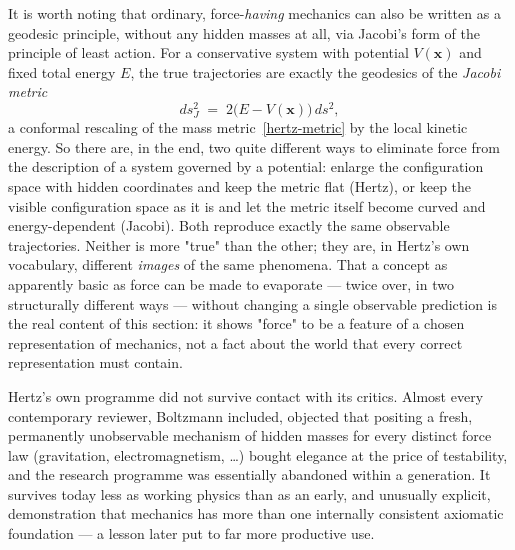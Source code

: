 It is worth noting that ordinary, force-\emph{having} mechanics can
also be written as a geodesic principle, without any hidden masses
at all, via Jacobi's form of the principle of least action. For a
conservative system with potential $V(\mathbf x)$ and fixed total
energy $E$, the true trajectories are exactly the geodesics of the
\emph{Jacobi metric}
\begin{equation}
  ds_J^2 \;=\; 2\bigl(E-V(\mathbf x)\bigr)\, ds^2 ,
  \label{jacobi-metric}
\end{equation}
a conformal rescaling of the mass metric~\eqref{hertz-metric} by
the local kinetic energy. So there are, in the end, two quite
different ways to eliminate force from the description of a system
governed by a potential: enlarge the configuration space with hidden
coordinates and keep the metric flat (Hertz), or keep the visible
configuration space as it is and let the metric itself become curved
and energy-dependent (Jacobi). Both reproduce exactly the same
observable trajectories. Neither is more "true" than the other; they
are, in Hertz's own vocabulary, different \emph{images} of the same
phenomena. That a concept as apparently basic as force can be made
to evaporate --- twice over, in two structurally different ways ---
without changing a single observable prediction is the real content
of this section: it shows "force" to be a feature of a chosen
representation of mechanics, not a fact about the world that every
correct representation must contain.

Hertz's own programme did not survive contact with its critics.
Almost every contemporary reviewer, Boltzmann included, objected
that positing a fresh, permanently unobservable mechanism of hidden
masses for every distinct force law (gravitation, electromagnetism,
\ldots) bought elegance at the price of testability, and the
research programme was essentially abandoned within a generation. It
survives today less as working physics than as an early, and
unusually explicit, demonstration that mechanics has more than one
internally consistent axiomatic foundation --- a lesson later put to
far more productive use.
